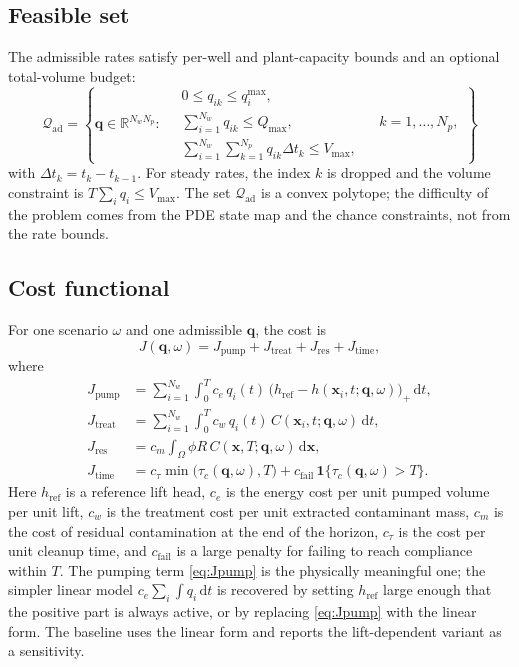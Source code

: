 \documentclass[11pt]{article}
\numberwithin{equation}{section}
\newcommand{\R}{\mathbb{R}}
\newcommand{\dd}{\,\mathrm{d}}
\newcommand{\xx}{\mathbf{x}}
\newcommand{\ind}{\mathbf{1}}
\theoremstyle{plain}
\begin{document}
\subsection{Feasible set}

The admissible rates satisfy per-well and plant-capacity bounds and an
optional total-volume budget:
\begin{equation}
\label{eq:Qad}
\mathcal{Q}_{\mathrm{ad}}
=\left\{\mathbf{q}\in\R^{N_wN_p}:\
\begin{aligned}
&0\le q_{ik}\le q_i^{\max},\\
&\sum_{i=1}^{N_w}q_{ik}\le Q_{\max}, && k=1,\dots,N_p,\\
&\sum_{i=1}^{N_w}\sum_{k=1}^{N_p}q_{ik}\Delta t_k\le V_{\max},
\end{aligned}
\right\}
\end{equation}
with $\Delta t_k=t_k-t_{k-1}$.  For steady rates, the index $k$ is dropped and
the volume constraint is $T\sum_i q_i\le V_{\max}$.  The set
$\mathcal{Q}_{\mathrm{ad}}$ is a convex polytope; the difficulty of the
problem comes from the PDE state map and the chance constraints, not from the
rate bounds.

\subsection{Cost functional}
\label{sec:cost}

For one scenario $\omega$ and one admissible $\mathbf{q}$, the cost is
\begin{equation}
\label{eq:cost}
J(\mathbf{q},\omega)
=J_{\mathrm{pump}}+J_{\mathrm{treat}}+J_{\mathrm{res}}+J_{\mathrm{time}},
\end{equation}
where
\begin{align}
J_{\mathrm{pump}}
&=\sum_{i=1}^{N_w}\int_0^T
c_e\,q_i(t)\,\bigl(h_{\mathrm{ref}}-h(\xx_i,t;\mathbf{q},\omega)\bigr)_+
\dd t,
\label{eq:Jpump}\\
J_{\mathrm{treat}}
&=\sum_{i=1}^{N_w}\int_0^T
c_w\,q_i(t)\,C(\xx_i,t;\mathbf{q},\omega)\dd t,
\label{eq:Jtreat}\\
J_{\mathrm{res}}
&=c_m\int_\Omega\phi R\,C(\xx,T;\mathbf{q},\omega)\dd\xx,
\label{eq:Jres}\\
J_{\mathrm{time}}
&=c_\tau\min\bigl(\tau_c(\mathbf{q},\omega),T\bigr)
+c_{\mathrm{fail}}\,\ind\{\tau_c(\mathbf{q},\omega)>T\}.
\label{eq:Jtime}
\end{align}
Here $h_{\mathrm{ref}}$ is a reference lift head, $c_e$ is the energy cost per
unit pumped volume per unit lift, $c_w$ is the treatment cost per unit
extracted contaminant mass, $c_m$ is the cost of residual contamination at the
end of the horizon, $c_\tau$ is the cost per unit cleanup time, and
$c_{\mathrm{fail}}$ is a large penalty for failing to reach compliance within
$T$.  The pumping term \eqref{eq:Jpump} is the physically meaningful one; the
simpler linear model $c_e\sum_i\int q_i\dd t$ is recovered by setting
$h_{\mathrm{ref}}$ large enough that the positive part is always active, or by
replacing \eqref{eq:Jpump} with the linear form.  The baseline uses the linear
form and reports the lift-dependent variant as a sensitivity.
\end{document}
